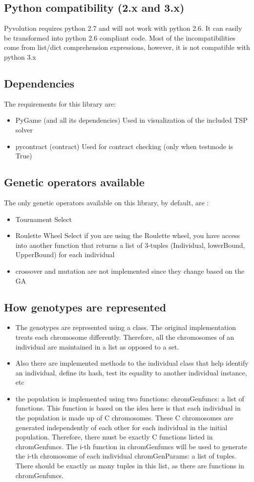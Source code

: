 \documentclass{article}
\begin{document}
	\subsection{Python compatibility (2.x and 3.x)}
	Pyvolution requires python 2.7 and will not work with python 2.6. It can easily be transformed into python 2.6 compliant code. Most of the incompatibilities come from list/dict comprehension expressions, however, it is not compatible with python 3.x
	\subsection{Dependencies}
	The requirements for this library are:
	\begin{itemize}
		\item PyGame (and all its dependencies)
		\subitem Used in visualization of the included TSP solver
		\item pycontract (contract)
		\subitem Used for contract checking (only when testmode is True)
	\end{itemize}
	\subsection{Genetic operators available}
	The only genetic operators available on this library, by default, are :
	\begin{itemize}
		\item Tournament Select
		\item Roulette Wheel Select
		\subitem if you are using the Roulette wheel, you have access into another function that returns a list of 3-tuples  (Individual, lowerBound, UpperBound) for each individual
		\item crossover and mutation are not implemented since they change based on the GA
	\end{itemize}
	\subsection{How genotypes are represented}
	\begin{itemize}
		\item The genotypes are represented using a class.  The original implementation treats each chromosome differently. Therefore, all the chromosomes of an individual are maintained in a list as opposed to a set.
		\item Also there are implemented methods to the individual class that help identify an individual, define its hash, test its equality to another individual instance, etc
		\item the population is implemented using two functions:
		\subitem chromGenfuncs: a list of functions. This function is based on the idea here is that each individual in the population is made up of C chromosomes. These C chromosomes are generated independently of each other for each individual in the initial population. Therefore, there must be exactly C functions listed in chromGenfuncs. The i-th function in chromGenfuncs will be used to generate the i-th chromosome of each individual
		\subitem chromGenParams: a list of tuples. There should be exactly as many tuples in this list, as there are functions in chromGenfuncs. 
	\end{itemize}
\end{document}
